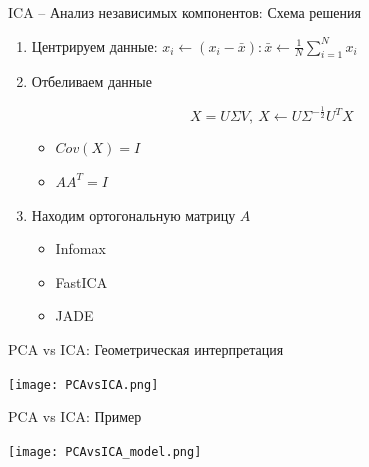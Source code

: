 \documentclass[pdf, intlimits, 9pt, unicode]{beamer}
\begin{document}
\begin{frame}{ICA -- Анализ независимых компонентов: Схема решения}

\begin{enumerate}
\item Центрируем данные: $x_i \leftarrow (x_i - \bar{x}) : \bar{x} \leftarrow \frac{1}{N} \sum\limits_{i=1}^{N} x_i$\pause
\item Отбеливаем данные

$$X = U \Sigma V, ~ X \leftarrow U \Sigma^{-\frac{1}{2}} U^T X$$

    \begin{itemize}
        \item $Cov(X) = I$
        \item $AA^T = I$
    \end{itemize}

\item Находим ортогональную матрицу $A$

    \begin{itemize}
        \item Infomax
        \item FastICA
        \item JADE
    \end{itemize}
\end{enumerate}

\end{frame}







\begin{frame}{PCA vs ICA: Геометрическая интерпретация}
\begin{center}\texttt{[image: PCAvsICA.png]}\end{center}
\end{frame}

\begin{frame}{PCA vs ICA: Пример}
\begin{center}\texttt{[image: PCAvsICA\_model.png]}\end{center}
\end{frame}
\end{document}
